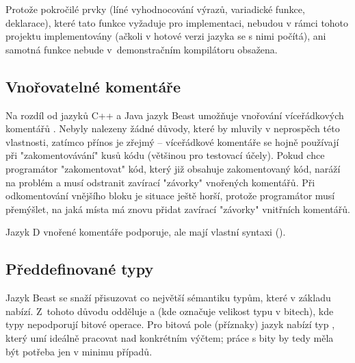 Protože pokročilé prvky (líné vyhodnocování výrazů, variadické funkce,  deklarace), které tato funkce vyžaduje pro implementaci, nebudou v rámci tohoto projektu implementovány (ačkoli v hotové verzi jazyka se s nimi počítá), ani samotná funkce  nebude v~demonstračním kompilátoru obsažena.


\subsection{Vnořovatelné komentáře}
Na rozdíl od jazyků C++ a Java jazyk Beast umožňuje vnořování víceřádkových komentářů . Nebyly nalezeny žádné důvody, které by mluvily v neprospěch této vlastnosti, zatímco přínos je zřejmý -- víceřádkové komentáře se hojně používají při "zakomentovávání" kusů kódu (většinou pro testovací účely). Pokud chce programátor "zakomentovat" kód, který již obsahuje zakomentovaný kód, naráží na problém a musí odstranit zavírací "závorky" \inlineCode{*/} vnořených komentářů. Při odkomentování vnějšího bloku je situace ještě horší, protože programátor musí přemýšlet, na jaká místa má znovu přidat zavírací "závorky" vnitřních komentářů.

Jazyk D vnořené komentáře podporuje, ale mají vlastní syntaxi ().


\subsection{Předdefinované typy}
Jazyk Beast se snaží přisuzovat co největší sémantiku typům, které v základu nabízí. Z~tohoto důvodu odděluje  a  (kde  označuje velikost typu v bitech), kde typy  nepodporují bitové operace. Pro bitová pole (příznaky) jazyk nabízí typ , který umí ideálně pracovat nad konkrétním výčtem; práce s bity by tedy měla být potřeba jen v minimu případů.

